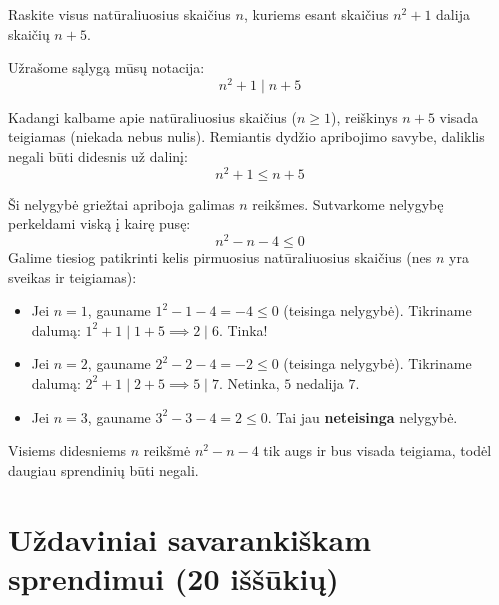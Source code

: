 \documentclass[11pt,a4paper]{scrartcl}
\begin{document}
\vspace{0.5cm}

\begin{example}
Raskite visus natūraliuosius skaičius \(n\), kuriems esant skaičius \(n^2 + 1\) dalija skaičių \(n + 5\).
\end{example}

\begin{solution}
Užrašome sąlygą mūsų notacija:
\begin{equation*} 
n^2 + 1 \mid n + 5 
\end{equation*}

Kadangi kalbame apie natūraliuosius skaičius (\(n \ge 1\)), reiškinys \(n + 5\) visada teigiamas (niekada nebus nulis). Remiantis dydžio apribojimo savybe, daliklis negali būti didesnis už dalinį:
\begin{equation*} 
n^2 + 1 \le n + 5 
\end{equation*}

Ši nelygybė griežtai apriboja galimas \(n\) reikšmes. Sutvarkome nelygybę perkeldami viską į kairę pusę:
\begin{equation*} 
n^2 - n - 4 \le 0 
\end{equation*}
Galime tiesiog patikrinti kelis pirmuosius natūraliuosius skaičius (nes \(n\) yra sveikas ir teigiamas):
\begin{itemize}
    \item Jei \(n = 1\), gauname \(1^2 - 1 - 4 = -4 \le 0\) (teisinga nelygybė). Tikriname dalumą: \(1^2 + 1 \mid 1 + 5 \implies 2 \mid 6\). Tinka!
    \item Jei \(n = 2\), gauname \(2^2 - 2 - 4 = -2 \le 0\) (teisinga nelygybė). Tikriname dalumą: \(2^2 + 1 \mid 2 + 5 \implies 5 \mid 7\). Netinka, $5$ nedalija $7$.
    \item Jei \(n = 3\), gauname \(3^2 - 3 - 4 = 2 \le 0\). Tai jau \textbf{neteisinga} nelygybė.
\end{itemize}
Visiems didesniems \(n\) reikšmė \(n^2 - n - 4\) tik augs ir bus visada teigiama, todėl daugiau sprendinių būti negali.
\end{solution}

\vspace{1cm}

\newpage
\section{Uždaviniai savarankiškam sprendimui (20 iššūkių)}
\end{document}
